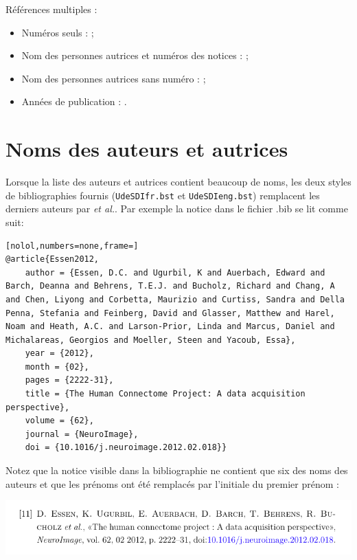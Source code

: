 Références multiples :
\begin{itemize} 
	\item Numéros seuls : \citep{auclair02a, tschumperle02, weickert97};
	\item Nom des personnes autrices et numéros des notices : \citet{auclair02a, tschumperle02, weickert97};
	\item Nom des personnes autrices sans numéro : \citeauthor{auclair02a, tschumperle02, weickert97};
	\item Années de publication : \citeyear{auclair02a, tschumperle02, weickert97}.
\end{itemize}

\section{Noms des auteurs et autrices}

Lorsque la liste des auteurs et autrices contient beaucoup de noms, les deux styles de bibliographies fournis (\texttt{UdeSDIfr.bst} et \texttt{UdeSDIeng.bst}) remplacent les derniers auteurs par \textit{et al.}. Par exemple la notice dans le fichier .bib se lit comme suit:
\begin{lstlisting}[nolol,numbers=none,frame=]
@article{Essen2012,
	author = {Essen, D.C. and Ugurbil, K and Auerbach, Edward and Barch, Deanna and Behrens, T.E.J. and Bucholz, Richard and Chang, A and Chen, Liyong and Corbetta, Maurizio and Curtiss, Sandra and Della Penna, Stefania and Feinberg, David and Glasser, Matthew and Harel, Noam and Heath, A.C. and Larson-Prior, Linda and Marcus, Daniel and Michalareas, Georgios and Moeller, Steen and Yacoub, Essa},
	year = {2012},
	month = {02},
	pages = {2222-31},
	title = {The Human Connectome Project: A data acquisition perspective},
	volume = {62},
	journal = {NeuroImage},
	doi = {10.1016/j.neuroimage.2012.02.018}}
\end{lstlisting}

Notez que la notice visible dans la bibliographie ne contient que six des noms des auteurs et que les prénoms ont été remplacés par l'initiale du premier prénom :
\begin{center}
	\includegraphics[width=\linewidth]{"Notice"}
\end{center}

